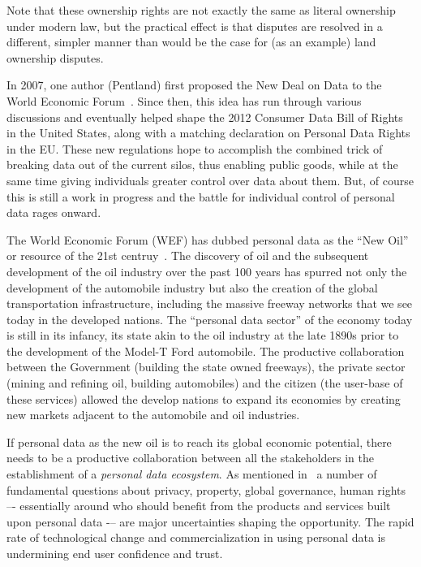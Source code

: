 Note that these ownership rights are not exactly the same as literal ownership under modern law, but the practical effect is that disputes are resolved in a different, simpler manner than would be the case for (as an example) land ownership disputes.

In 2007, one author (Pentland) first proposed the New Deal on Data to the World Economic Forum~\cite{WEF2011}. 
Since then, this idea has run through various discussions and eventually helped shape the 2012 Consumer Data Bill of Rights in the United States, along with a matching declaration on Personal Data Rights in the EU.
These new regulations hope to accomplish the combined trick of breaking data out of the current silos, thus enabling public goods, while at the same time giving individuals greater control over data about them.
But, of course this is still a work in progress and the battle for individual control of personal data rages onward.


The World Economic Forum (WEF) has dubbed personal data
as the ``New Oil'' or resource of the 21st centruy~\cite{WEF2011}.
The discovery of oil and the subsequent development
of the oil industry over the past 100 years
has spurred not only the development of the
automobile industry but also the creation
of the global transportation infrastructure,
including the massive freeway networks that we see
today in the developed nations.
The ``personal data sector'' of the economy
today is still in its infancy, its state akin
to the oil industry at the late 1890s
prior to the development of the Model-T Ford automobile.
The productive collaboration between the Government
(building the state owned freeways),
the private sector (mining and refining oil, building automobiles)
and the citizen (the user-base of these services)
allowed the develop nations to expand its economies
by creating new markets adjacent to the automobile and oil industries.

If personal data as the new oil is to reach 
its global economic potential, there needs to be a productive
collaboration between all the stakeholders
in the establishment of a {\em personal data ecosystem}.
As mentioned in~\cite{WEF2011}
a number of fundamental questions about privacy, property, 
global governance, human rights –-
essentially around who should benefit from 
the products and services built upon personal data -– 
are major uncertainties shaping the opportunity.
The rapid rate of technological change and commercialization 
in using personal data is undermining end user confidence and trust.

